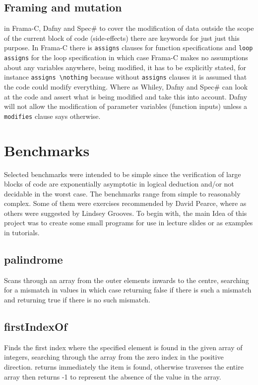 \documentclass[10pt]{article} %
\begin{document}
\subsection{Framing and mutation}
in Frama-C, Dafny and Spec\# to cover the modification of data outside the scope of the current block of code (side-effects) there are keywords for just just this purpose. In Frama-C there is \verb/assigns/ clauses for function specifications and \verb/loop assigns/ for the loop specification in which case Frama-C makes no assumptions about any variables anywhere, being modified, it has to be explicitly stated, for instance \verb/assigns \nothing/ because without \verb/assigns/ clauses it is assumed that the code could modify everything. Where as Whiley, Dafny and Spec\# can look at the code and assert what is being modified and take this into account. Dafny will not allow the modification of parameter variables (function inputs) unless a \verb/modifies/ clause says otherwise.

\section{Benchmarks}
Selected benchmarks were intended to be simple since the verification of large blocks of code are exponentially asymptotic in logical deduction and\slash or not decidable in the worst case. The benchmarks range from simple to reasonably complex. Some of them were exercises recommended by David Pearce, where as others were suggested by Lindsey Grooves. To begin with, the main Idea of this project was to create some small programs for use in lecture slides or as examples in tutorials. 

\subsection{palindrome} 
Scans through an array from the outer elements inwards to the centre, searching for a mismatch in values in which case returning false if there is such a mismatch and returning true if there is no such mismatch.

\subsection{firstIndexOf}
Finds the first index where the specified element is found in the given array of integers, searching through the array from the zero index in the positive direction. returns immediately the item is found, otherwise traverses the entire array then returns -1 to represent the absence of the value in the array.
\end{document}
